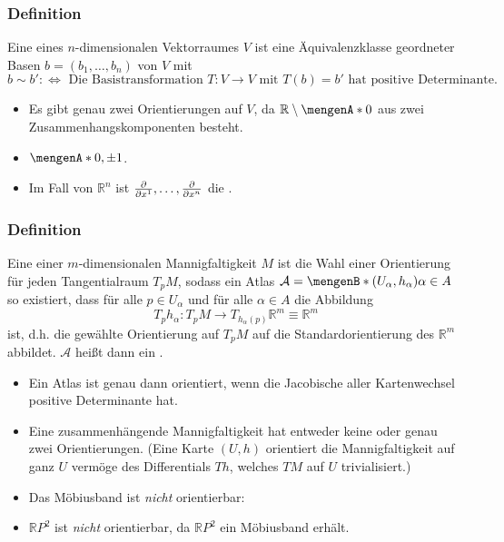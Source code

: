 \subsubsection[Definition: Orientierung von Vektorräumen]{Definition} %
\label{ssub:541}
Eine  eines $n$-dimensionalen Vektorraumes $V$ ist eine Äquivalenzklasse geordneter Basen $b=(b_1, \ldots, b_n)$ von $V$ mit 
\[
	b \sim b' :\Leftrightarrow \text{ Die Basistransformation } T : V \to V \text{ mit $T(b)=b'$ hat positive Determinante.}
\]
\begin{itemize}
	\item Es gibt genau zwei Orientierungen auf $V$, da $\mathds{R} \setminus \set{0}$ aus zwei Zusammenhangskomponenten besteht. 
	\item $\set{0}, \pm 1$.
	\item Im Fall von $\mathds{R}^n$ ist $\frac{{\partial }}{{\partial x^1}} , \ldots , \frac{{\partial }}{{\partial x^n}} $ die .
\end{itemize}

\subsubsection[Definition: Orientierung einer Mannigfaltigkeit]{Definition} %
\label{ssub:542}
Eine  einer $m$-dimensionalen Mannigfaltigkeit $M$ ist die Wahl einer Orientierung für jeden Tangentialraum $T_p M$, sodass ein Atlas 
$\mathcal{A} = \set[(U_\alpha, h_\alpha)]{\alpha \in A}$ so existiert, dass für alle $p \in U_\alpha$ und für alle $\alpha \in A$ die Abbildung
\[
	T_p h_\alpha : T_p M \to T_{h_\alpha(p)} \mathds{R}^m \equiv \mathds{R}^m
\]
 ist, d.h. die gewählte Orientierung auf $T_p M$ auf die Standardorientierung des $\mathds{R}^m$ abbildet. $\mathcal{A}$ heißt dann ein
.
\begin{itemize}
	\item Ein Atlas ist genau dann orientiert, wenn die Jacobische aller Kartenwechsel positive Determinante hat.
	\item Eine zusammenhängende Mannigfaltigkeit hat entweder keine oder genau zwei Orientierungen. (Eine Karte $(U,h)$ orientiert die Mannigfaltigkeit auf ganz $U$ vermöge
	des Differentials $T h$, welches $T M$ auf $U$ trivialisiert.)
	\item Das Möbiusband ist \emph{nicht} orientierbar:
	\item $\mathds{R}P^2$ ist \emph{nicht} orientierbar, da $\mathds{R}P^2$ ein Möbiusband erhält.
\end{itemize}


